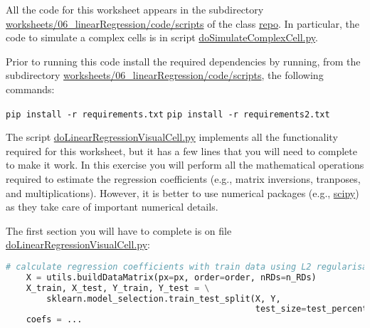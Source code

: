 \documentclass[12pt]{article}
\begin{document}
All the code for this worksheet appears in the subdirectory
\href{https://github.com/joacorapela/neuroinformatics24/blob/master/worksheets/06_linearRegression/code/scripts}{worksheets/06\_linearRegression/code/scripts} of the class
\href{https://github.com/joacorapela/neuroinformatics24}{repo}. In particular,
the code to simulate a complex cells is in script
\href{https://github.com/joacorapela/neuroinformatics24/blob/master/worksheets/06_linearRegression/code/scripts/doSimulateComplexCell.py}{doSimulateComplexCell.py}.

Prior to running this code install the required dependencies by running, from the subdirectory
\href{https://github.com/joacorapela/neuroinformatics24/blob/master/worksheets/06_linearRegression/code/scripts}{worksheets/06\_linearRegression/code/scripts},
the following commands:

\noindent\texttt{pip install -r requirements.txt}\linebreak
\noindent\texttt{pip install -r requirements2.txt}

The script
\href{https://github.com/joacorapela/neuroinformatics24/blob/master/worksheets/06_linearRegression/code/scripts/doLinearRegressionVisualCell.py}{doLinearRegressionVisualCell.py}
implements all the functionality required for this worksheet, but it has a few
lines that you will need to complete to make it work. In this exercise you will
perform all the mathematical operations required to estimate the regression
coefficients (e.g., matrix inversions, tranposes, and multiplications).
However, it is better to use numerical packages (e.g.,
\href{https://scipy.org/}{scipy}) as they take care of important numerical
details.

The first section you will have to complete is on file
\href{https://github.com/joacorapela/neuroinformatics24/blob/master/worksheets/06_linearRegression/code/scripts/https://github.com/joacorapela/neuroinformatics24/blob/master/worksheets/06_linearRegression/code/scripts/doLinearRegressionVisualCell.py}{doLinearRegressionVisualCell.py}:

\begin{lstlisting}[language=python]
    # calculate regression coefficients with train data using L2 regularisation
    X = utils.buildDataMatrix(px=px, order=order, nRDs=n_RDs)
    X_train, X_test, Y_train, Y_test = \
        sklearn.model_selection.train_test_split(X, Y,
                                                 test_size=test_percentage)
    coefs = ...
\end{lstlisting}
\end{document}
